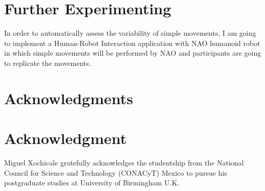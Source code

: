 \documentclass[9pt,journal,onecolumn,compsoc]{IEEEtran}
\begin{document}
\section{Further Experimenting}

In order to automatically assess the variability of simple movements, 
I am going to implement a Human-Robot Interaction application 
with NAO humanoid robot \cite{NAO}
in which simple movements will be performed by NAO 
and participants are going to replicate the movements.


\ifCLASSOPTIONcompsoc
  \section*{Acknowledgments}
\else
  \section*{Acknowledgment}
\fi

Miguel Xochicale gratefully acknowledges the studentship from 
the National Council for Science and Technology (CONACyT) Mexico
to pursue his postgraduate studies at University of Birmingham U.K.

\ifCLASSOPTIONcaptionsoff
  \newpage
\fi





%
%
%
% 
% 
\end{document}
